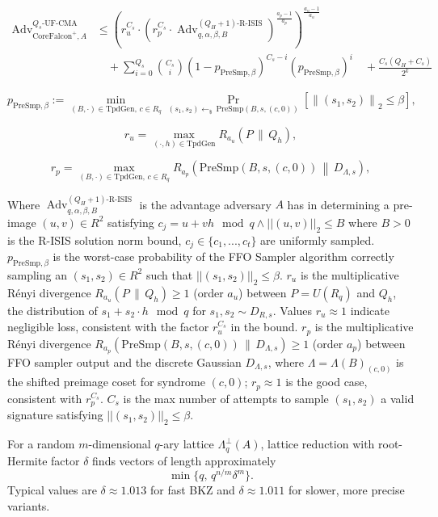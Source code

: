 \begin{definition}

  $$
  \begin{aligned}
  \operatorname{Adv}^{Q_s\text{-}\mathrm{UF}\text{-}\mathrm{CMA}}_{\mathrm{CoreFalcon}^{+}, A}
  &\le
  \left(
  r_u^{C_s}
  \cdot
  \left(
  r_p^{C_s}
  \cdot
  \operatorname{Adv}^{(Q_H+1)\text{-}\mathrm{R}\text{-}\mathrm{ISIS}}_{q,\alpha,\beta,B}
  \right)^{\frac{a_p-1}{a_p}}
  \right)^{\frac{a_u-1}{a_u}}
  \\
  &\quad+
  \sum_{i=0}^{Q_s}
  \binom{C_s}{i}
  (1-p_{\mathrm{PreSmp},\beta})^{C_s-i}
  (p_{\mathrm{PreSmp},\beta})^i
  \quad+
  \frac{C_s(Q_H+C_s)}{2^k}
  \end{aligned}
  $$
  
  $$
  p_{\mathrm{PreSmp},\beta}
  :=
  \min_{(B,\cdot)\in \mathrm{TpdGen},\, c\in R_q}
  \Pr_{(s_1,s_2)\gets_{\$}\, \mathrm{PreSmp}(B,s,(c,0))}
  \left[
  \left\|(s_1,s_2)\right\|_2 \le \beta
  \right],
  $$
  
  $$
  r_u = \max_{(\cdot,h)\in \mathrm{TpdGen}} R_{a_u}(P \,\|\, Q_h),
  $$
  
  $$
  r_p = \max_{(B,\cdot)\in \mathrm{TpdGen},\, c\in R_q} R_{a_p} \left( \mathrm{PreSmp}(B,s,(c,0)) \,\middle\|\, D_{\Lambda,s} \right),
  $$

  Where $\operatorname{Adv}^{(Q_H+1)\text{-}\mathrm{R\text{-}ISIS}}_{q,\alpha,\beta,B}$ is the advantage adversary $A$ has in determining a 
  pre-image $(u, v) \in R^2$ satisfying $c_j = u + vh \mod q \land ||(u, v)||_2 \le B$ where $B > 0$ is the R-ISIS solution norm bound, 
  $c_j \in \{c_1, ..., c_t\}$ are uniformly sampled. $p_{\mathrm{PreSmp},\beta}$ is the worst-case probability of the FFO Sampler algorithm 
  correctly sampling an $(s_1, s_2) \in R^2$ such that $||(s_1,s_2)||_2 \le \beta$. $r_u$ is the multiplicative Rényi divergence 
  $R_{a_u}(P \,\|\, Q_h) \ge 1$ (order $a_u$) between $P = U(R_q)$ and $Q_h$, the distribution of $s_1 + s_2\cdot h \mod q$ for $s_1, s_2 \sim D_{R, s}$. 
  Values $r_u \approx 1$ indicate negligible loss, consistent with the factor $r_u^{C_s}$ in the bound. $r_p$ is the multiplicative Rényi divergence 
  $R_{a_p}(\mathrm{PreSmp}(B,s,(c,0)) \,\|\, D_{\Lambda,s}) \ge 1$ (order $a_p$) between FFO sampler output and the discrete Gaussian $D_{\Lambda,s}$, 
  where $\Lambda=\Lambda(B)_{(c,0)}$ is the shifted preimage coset for syndrome $(c,0)$; $r_p \approx 1$ is the good case, consistent with $r_p^{C_s}$. 
  $C_s$ is the max number of attempts to sample $(s_1, s_2)$ a valid signature satisfying $||(s_1,s_2)||_2 \le \beta$.
\end{definition}

\begin{definition}
For a random $m$-dimensional $q$-ary lattice $\Lambda_q^\perp(A)$, lattice reduction with root-Hermite factor $\delta$ finds vectors of length approximately
\[
\min\{q,\, q^{n/m}\delta^m\}.
\]
Typical values are $\delta \approx 1.013$ for fast BKZ and $\delta \approx 1.011$ for slower, more precise variants.
\end{definition}


